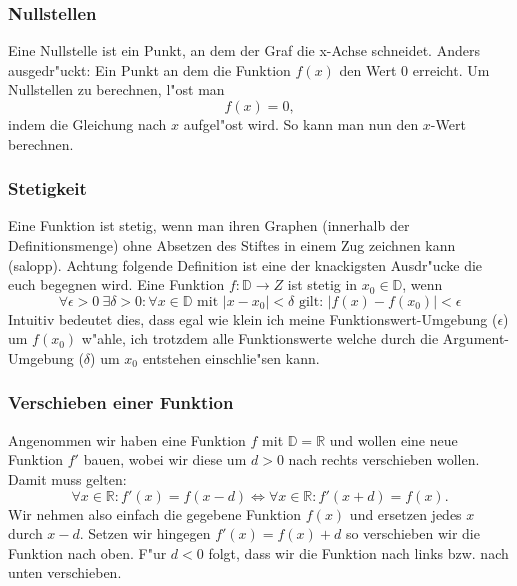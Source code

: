 \subsubsection{Nullstellen}
Eine Nullstelle ist ein Punkt, an dem der Graf die x-Achse schneidet. Anders ausgedr"uckt: Ein Punkt an dem die Funktion $f(x)$ den Wert $0$ erreicht. Um Nullstellen zu berechnen, l"ost man
\begin{equation*}
f(x) = 0,
\end{equation*}
indem die Gleichung nach $x$ aufgel"ost wird. So kann man nun den $x$-Wert berechnen.

\subsubsection{Stetigkeit}
Eine Funktion ist stetig, wenn man ihren Graphen (innerhalb der Definitionsmenge) ohne Absetzen des Stiftes in einem Zug zeichnen kann (salopp). Achtung folgende Definition ist eine der knackigsten Ausdr"ucke die euch begegnen wird. Eine Funktion $f : \mathbb{D} \to Z$ ist stetig in $x_0 \in \mathbb{D}$, wenn
\begin{equation*}
\forall \epsilon > 0 \ \exists \delta > 0 : \forall x \in \mathbb{D} \text{ mit } \left|x - x_0 \right| < \delta \text{ gilt: } \left| f(x) - f(x_0) \right| < \epsilon 
\end{equation*}
Intuitiv bedeutet dies, dass egal wie klein ich meine Funktionswert-Umgebung ($\epsilon$) um $f(x_0)$ w"ahle, ich trotzdem alle Funktionswerte welche durch die Argument-Umgebung ($\delta$) um $x_0$ entstehen einschlie"sen kann.

\subsubsection{Verschieben einer Funktion} \label{sec:verschieben}
Angenommen wir haben eine Funktion $f$ mit $\mathbb{D} = \mathbb{R}$ und wollen eine neue Funktion $f'$ bauen, wobei wir diese um $d > 0$ nach rechts verschieben wollen. Damit muss gelten:
\begin{equation*}
\forall x \in \mathbb{R} :  f'(x) = f(x-d) \iff \forall x \in \mathbb{R} : f'(x+d) = f(x).
\end{equation*}
Wir nehmen also einfach die gegebene Funktion $f(x)$ und ersetzen jedes $x$ durch $x-d$. Setzen wir hingegen $f'(x) = f(x) + d$ so verschieben wir die Funktion nach oben. F"ur $d < 0$ folgt, dass wir die Funktion nach links bzw. nach unten verschieben.